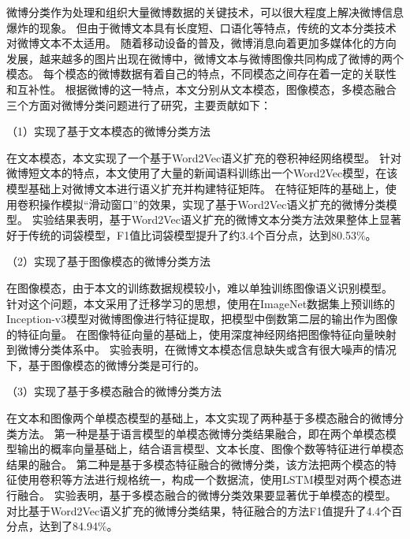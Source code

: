 \begin{cabstract}
微博分类作为处理和组织大量微博数据的关键技术，可以很大程度上解决微博信息爆炸的现象。
但由于微博文本具有长度短、口语化等特点，传统的文本分类技术对微博文本不太适用。
随着移动设备的普及，微博消息向着更加多媒体化的方向发展，越来越多的图片出现在微博中，微博文本与微博图像共同构成了微博的两个模态。
每个模态的微博数据有着自己的特点，不同模态之间存在着一定的关联性和互补性。
根据微博的这一特点，本文分别从文本模态，图像模态，多模态融合三个方面对微博分类问题进行了研究，主要贡献如下：


（1）实现了基于文本模态的微博分类方法

在文本模态，本文实现了一个基于Word2Vec语义扩充的卷积神经网络模型。
针对微博短文本的特点，本文使用了大量的新闻语料训练出一个Word2Vec模型，在该模型基础上对微博文本进行语义扩充并构建特征矩阵。
在特征矩阵的基础上，使用卷积操作模拟``滑动窗口''的效果，实现了基于Word2Vec语义扩充的微博分类模型。
实验结果表明，基于Word2Vec语义扩充的微博文本分类方法效果整体上显著好于传统的词袋模型，F1值比词袋模型提升了约3.4个百分点，达到80.53\%。



（2）实现了基于图像模态的微博分类方法

在图像模态，由于本文的训练数据规模较小，难以单独训练图像语义识别模型。
针对这个问题，本文采用了迁移学习的思想，使用在ImageNet数据集上预训练的Inception-v3模型对微博图像进行特征提取，把模型中倒数第二层的输出作为图像的特征向量。
在图像特征向量的基础上，使用深度神经网络把图像特征向量映射到微博分类体系中。
实验表明，在微博文本模态信息缺失或含有很大噪声的情况下，基于图像模态的微博分类是可行的。

（3）实现了基于多模态融合的微博分类方法

在文本和图像两个单模态模型的基础上，本文实现了两种基于多模态融合的微博分类方法。
第一种是基于语言模型的单模态微博分类结果融合，即在两个单模态模型输出的概率向量基础上，结合语言模型、文本长度、图像个数等特征进行单模态结果的融合。
第二种是基于多模态特征融合的微博分类，该方法把两个模态的特征使用卷积等方法进行规格统一，构成一个数据流，使用LSTM模型对两个模态进行融合。
实验表明，基于多模态融合的微博分类效果要显著优于单模态的模型。
对比基于Word2Vec语义扩充的微博分类结果，特征融合的方法F1值提升了4.4个百分点，达到了84.94\%。



\end{cabstract}


